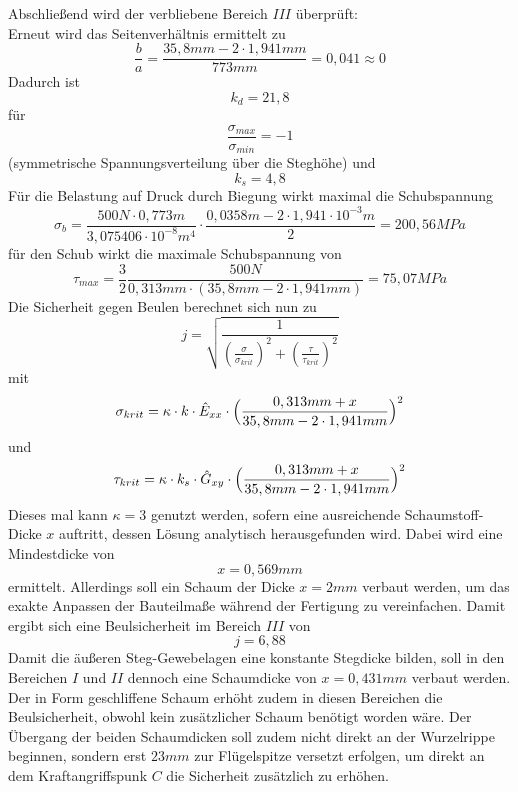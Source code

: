 \noindent Abschließend wird der verbliebene Bereich $III$ überprüft:\\
\noindent Erneut wird das Seitenverhältnis ermittelt zu 
\begin{equation}
	\frac{b}{a}=\frac{35,8mm - 2\cdot 1,941mm}{773mm}=0,041\approx 0
\end{equation}
Dadurch ist
\begin{equation}
	k_{d}=21,8
\end{equation}
für 
\begin{equation}
	\frac{\sigma_{max}}{\sigma_{min}}=-1
\end{equation} 
(symmetrische Spannungsverteilung über die Steghöhe) und
\begin{equation}
	k_{s} = 4,8
\end{equation}
Für die Belastung auf Druck durch Biegung wirkt maximal die Schubspannung
\begin{equation}
	\sigma_{b} = \frac{500N\cdot 0,773m}{3,075406\cdot 10^{-8}m^{4}}\cdot\frac{0,0358m - 2\cdot 1,941\cdot 10^{-3}m}{2}=200,56 MPa
\end{equation}
für den Schub wirkt die maximale Schubspannung von
\begin{equation}
	\tau_{max}=\frac{3}{2}\frac{500N}{0,313mm\cdot(35,8mm-2\cdot 1,941mm)}=75,07MPa
\end{equation}
Die Sicherheit gegen Beulen berechnet sich nun zu 
\begin{equation}
	j=\sqrt{\frac{1}{(\frac{\sigma}{\sigma_{krit}})^{2}+(\frac{\tau}{\tau_{krit}})^{2}}}
\end{equation}
mit 
\begin{equation}
	\sigma_{krit}=\kappa\cdot k\cdot \hat{E}_{xx}\cdot \Bigl(\frac{0,313mm+x}{35,8mm -2\cdot 1,941mm}\Bigr)^{2}
\end{equation}
und
\begin{equation}
	\tau_{krit} = \kappa\cdot k_{s}\cdot \hat{G}_{xy}\cdot\Bigl(\frac{0,313mm + x}{35,8mm -2\cdot 1,941mm}\Bigr)^{2}
\end{equation}
Dieses mal kann $\kappa=3$ genutzt werden, sofern eine ausreichende Schaumstoff-Dicke $x$ auftritt, dessen Lösung analytisch herausgefunden wird. Dabei wird eine Mindestdicke von 
\begin{equation}
	x=0,569mm
\end{equation}
ermittelt. Allerdings soll ein Schaum der Dicke $x=2mm$ verbaut werden, um das exakte Anpassen der Bauteilmaße während der Fertigung zu vereinfachen. Damit ergibt sich eine Beulsicherheit im Bereich $III$ von
\begin{equation}
	j=6,88
\end{equation}
Damit die äußeren Steg-Gewebelagen eine konstante Stegdicke bilden, soll in den Bereichen $I$ und $II$ dennoch eine Schaumdicke von $x=0,431mm$ verbaut werden. Der in Form geschliffene Schaum erhöht zudem in diesen Bereichen die Beulsicherheit, obwohl kein zusätzlicher Schaum benötigt worden wäre. Der Übergang der beiden Schaumdicken soll zudem nicht direkt an der Wurzelrippe beginnen, sondern erst $23mm$ zur Flügelspitze versetzt erfolgen, um direkt an dem Kraftangriffspunk $C$ die Sicherheit zusätzlich zu erhöhen.
